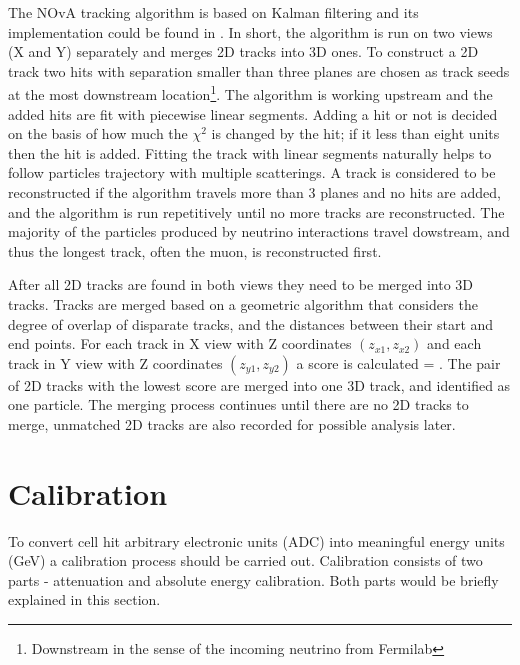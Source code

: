 The NOvA tracking algorithm is based on Kalman filtering \cite{Kalman} and its implementation could be found 
in \cite{Nick}. In short, the algorithm is run on two views (X and Y) separately and merges 2D tracks into
3D ones. To construct a 2D track two hits with separation smaller than three planes are chosen as track 
seeds at the most downstream location\footnote{Downstream in the sense of the incoming neutrino from Fermilab}. 
The algorithm is working upstream and the added hits are fit with piecewise linear segments. Adding a hit or not 
is decided on the basis of how much the $\chi^2$ is changed by the hit; if it less than eight units 
then the hit is added. Fitting the track with linear segments naturally helps to follow particles trajectory 
with multiple scatterings. A track is considered to be reconstructed if the algorithm travels more than 3 planes
and no hits are added, and the algorithm is run repetitively until no more tracks are reconstructed. 
The majority of the particles produced by neutrino interactions travel dowstream, and thus the longest 
track, often the muon, is reconstructed first.

After all 2D tracks are found in both views they need to be merged into 3D tracks. Tracks are merged based on
a geometric algorithm that considers the degree of overlap of disparate tracks, and the distances between
their start and end points. For each track in X view with Z coordinates $(z_{x1}, z_{x2})$ and each track in 
Y view with Z coordinates $(z_{y1}, z_{y2})$ a score is calculated
\be
{} = .
\ee
The pair of 2D tracks with the lowest score are merged into one 3D track, and identified as one particle.
The merging process continues until there are no 2D tracks to merge, unmatched 2D tracks are also recorded
for possible analysis later.

\section{Calibration}
To convert cell hit arbitrary electronic units (ADC) into meaningful energy units (GeV) a calibration 
process should be carried out. Calibration consists of two parts - attenuation and absolute energy calibration. 
Both parts would be briefly explained in this section.

